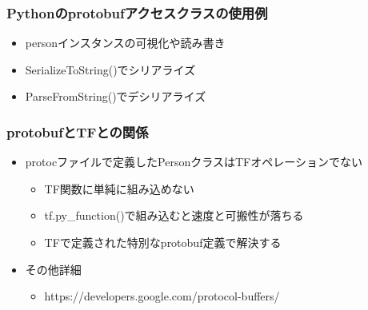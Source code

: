 \hypertarget{pythonux306eprotobufux30a2ux30afux30bbux30b9ux30afux30e9ux30b9ux306eux4f7fux7528ux4f8b}{%
\subsubsection{Pythonのprotobufアクセスクラスの使用例}\label{pythonux306eprotobufux30a2ux30afux30bbux30b9ux30afux30e9ux30b9ux306eux4f7fux7528ux4f8b}}

\begin{itemize}
\tightlist
\item
  personインスタンスの可視化や読み書き
\item
  SerializeToString()でシリアライズ
\item
  ParseFromString()でデシリアライズ
\end{itemize}

\hypertarget{protobufux3068tfux3068ux306eux95a2ux4fc2}{%
\subsubsection{protobufとTFとの関係}\label{protobufux3068tfux3068ux306eux95a2ux4fc2}}

\begin{itemize}
\tightlist
\item
  protocファイルで定義したPersonクラスはTFオペレーションでない

  \begin{itemize}
  \tightlist
  \item
    TF関数に単純に組み込めない
  \item
    tf.py\_function()で組み込むと速度と可搬性が落ちる
  \item
    TFで定義された特別なprotobuf定義で解決する
  \end{itemize}
\item
  その他詳細

  \begin{itemize}
  \tightlist
  \item
    https://developers.google.com/protocol-buffers/
  \end{itemize}
\end{itemize}
